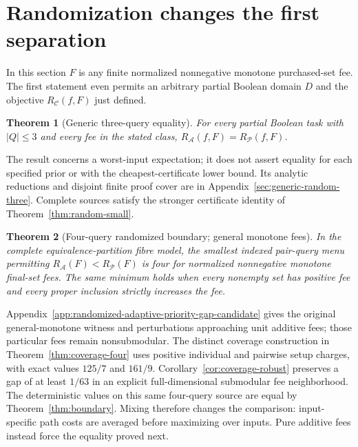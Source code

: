 \documentclass[pdflatex,sn-mathphys-num]{sn-jnl}
\theoremstyle{thmstyleone}
\newtheorem{theorem}{Theorem}
\theoremstyle{thmstylethree}
\theoremstyle{thmstyletwo}
\begin{document}
\section{Randomization changes the first separation}
\label{sec:randomized-core}
In this section $F$ is any finite normalized nonnegative monotone
purchased-set fee. The first statement even permits an arbitrary partial
Boolean domain $D$ and the objective $R_{\mathcal C}(f,F)$ just defined.

\begin{theorem}[Generic three-query equality]
\label{thm:generic-random-three}
For every partial Boolean task with $|Q|\leq3$ and every fee in the
stated class, $R_{\mathcal A}(f,F)=R_{\mathcal P}(f,F)$.
\end{theorem}

The result concerns a worst-input expectation; it does not assert
equality for each specified prior or with the cheapest-certificate
lower bound. Its analytic reductions and disjoint finite proof cover
are in Appendix~\ref{sec:generic-random-three}. Complete sources satisfy
the stronger certificate identity of Theorem~\ref{thm:random-small}.

\begin{theorem}[Four-query randomized boundary; general monotone fees]\label{thm:random-priority-four}
In the complete equivalence-partition fibre model, the smallest indexed
pair-query menu permitting $R_{\mathcal A}(F)<R_{\mathcal P}(F)$ is four
for normalized nonnegative monotone final-set fees. The same minimum
holds when every nonempty set has positive fee and every proper
inclusion strictly increases the fee.
\end{theorem}

Appendix~\ref{app:randomized-adaptive-priority-gap-candidate} gives
the original general-monotone witness and perturbations approaching unit
additive fees; those particular fees remain nonsubmodular. The distinct
coverage construction in Theorem~\ref{thm:coverage-four} uses positive
individual and pairwise setup charges, with exact values $125/7$ and
$161/9$. Corollary~\ref{cor:coverage-robust} preserves a gap of at least
$1/63$ in an explicit full-dimensional submodular fee neighborhood.
The deterministic values on this same four-query source are equal by
Theorem~\ref{thm:boundary}. Mixing therefore changes the comparison:
input-specific path costs are averaged before maximizing over inputs.
Pure additive fees instead force the equality proved next.


\end{document}
